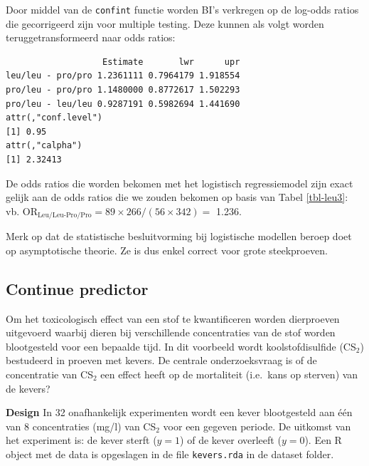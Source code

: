 \documentclass[
  dutch,
  letterpaper,
  12pt]{book}
\newenvironment{Shaded}{\begin{snugshade}}{\end{snugshade}}
\newcommand{\FunctionTok}[1]{\textcolor[rgb]{0.28,0.35,0.67}{#1}}
\newcommand{\NormalTok}[1]{\textcolor[rgb]{0.00,0.23,0.31}{#1}}
\newcommand{\OtherTok}[1]{\textcolor[rgb]{0.00,0.23,0.31}{#1}}
\newcommand{\SpecialCharTok}[1]{\textcolor[rgb]{0.37,0.37,0.37}{#1}}
\theoremstyle{definition}
\theoremstyle{definition}
\theoremstyle{definition}
\theoremstyle{remark}
\begin{document}
Door middel van de \texttt{confint} functie worden BI's verkregen op de
log-odds ratios die gecorrigeerd zijn voor multiple testing. Deze kunnen
als volgt worden teruggetransformeerd naar odds ratios:

\begin{Shaded}
\end{Shaded}

\begin{verbatim}
                   Estimate       lwr      upr
leu/leu - pro/pro 1.2361111 0.7964179 1.918554
pro/leu - pro/pro 1.1480000 0.8772617 1.502293
pro/leu - leu/leu 0.9287191 0.5982694 1.441690
attr(,"conf.level")
[1] 0.95
attr(,"calpha")
[1] 2.32413
\end{verbatim}

De odds ratios die worden bekomen met het logistisch regressiemodel zijn
exact gelijk aan de odds ratios die we zouden bekomen op basis van Tabel
\ref{tbl-leu3}: vb.
\(\text{OR}_\text{Leu/Leu-Pro/Pro}=89\times 266/(56\times 342)=\) 1.236.

Merk op dat de statistische besluitvorming bij logistische modellen
beroep doet op asymptotische theorie. Ze is dus enkel correct voor grote
steekproeven.

\subsection{Continue predictor}\label{continue-predictor}

Om het toxicologisch effect van een stof te kwantificeren worden
dierproeven uitgevoerd waarbij dieren bij verschillende concentraties
van de stof worden blootgesteld voor een bepaalde tijd. In dit voorbeeld
wordt koolstofdisulfide (CS\(_2\)) bestudeerd in proeven met kevers. De
centrale onderzoeksvraag is of de concentratie van CS\(_2\) een effect
heeft op de mortaliteit (i.e.~kans op sterven) van de kevers?

\textbf{Design} In 32 onafhankelijk experimenten wordt een kever
blootgesteld aan één van 8 concentraties (mg/l) van CS\(_2\) voor een
gegeven periode. De uitkomst van het experiment is: de kever sterft
(\(y=1\)) of de kever overleeft (\(y=0\)). Een R object met de data is
opgeslagen in de file \texttt{kevers.rda} in de dataset folder.
\end{document}
